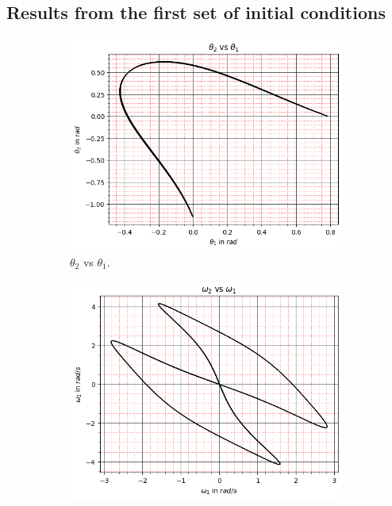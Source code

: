 \subsection{Results from the first set of initial conditions}
\begin{figure}[H]
    \centering
    \begin{subfigure}[b]{0.49\textwidth}
        \centering
        \includegraphics[width=\textwidth]{figures/initial-conditions-a/theta_2 vs theta_1.png}
        \caption{$\theta_2$ vs $\theta_1$.}
        \label{fig:2a}
    \end{subfigure}
    \hfill
    \begin{subfigure}[b]{0.49\textwidth}
        \centering
        \includegraphics[width=\textwidth]{figures/initial-conditions-a/omega_2 vs omega_1.png}

\end{subfigure}
\end{figure}
